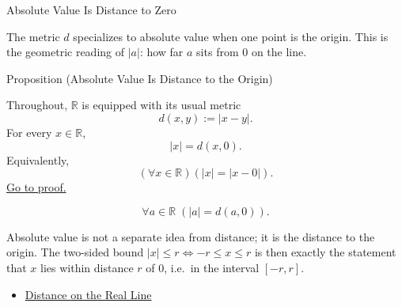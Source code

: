 \label{sec:absolute-value-as-distance}

\begin{topicbox}{Absolute Value Is Distance to Zero}
\begin{exposition}
The metric $d$ specializes to absolute value when one point is the origin. This is the geometric reading of $|a|$: how far $a$ sits from $0$ on the line.
\end{exposition}
\end{topicbox}
\begin{propositionbox}{Proposition (Absolute Value Is Distance to the Origin)}
\begin{proposition}
\label{prop:abs-value-is-distance-to-zero}
Throughout, $\mathbb{R}$ is equipped with its usual metric
\[
  d(x,y):=|x-y|.
\]
For every $x\in\mathbb{R}$,
\[
  |x|=d(x,0).
\]
Equivalently,
\[
  (\forall x\in\mathbb{R})(|x|=|x-0|).
\]
\hyperref[prf:abs-value-is-distance-to-zero]{Go to proof.}
\end{proposition}
\end{propositionbox}
\begin{remark*}
\[
\forall a\in\mathbb{R}\;(|a|=d(a,0)).
\]
\end{remark*}
\begin{remark*}[Interpretation]
Absolute value is not a separate idea from distance; it is the distance to the origin. The two-sided bound $|x|\le r \Leftrightarrow -r\le x\le r$ is then exactly the statement that $x$ lies within distance $r$ of $0$, i.e.\ in the interval $[-r,r]$.
\end{remark*}
\begin{dependencies}
\begin{itemize}
  \item \hyperref[def:distance-on-real-line]{Distance on the Real Line}
\end{itemize}
\end{dependencies}
